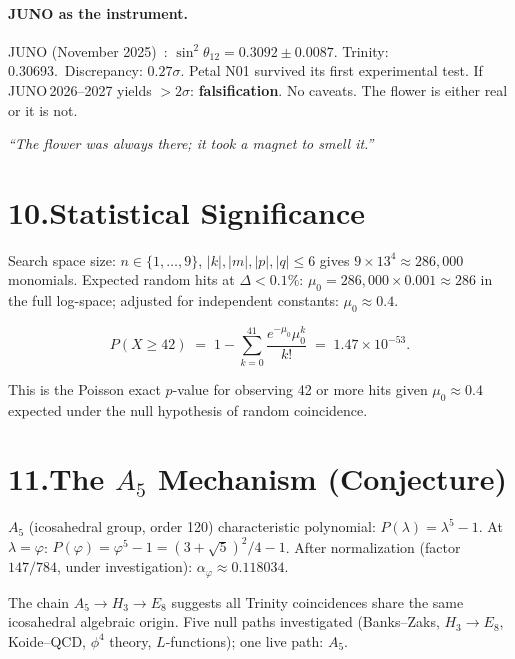\documentclass[12pt,a4paper]{article}
\newcommand{\ph}{\varphi}
\begin{document}
\paragraph{JUNO as the instrument.}
JUNO (November 2025)~\cite{juno2025}: $\sin^2\theta_{12}=0.3092\pm0.0087$.
Trinity: 0.30693.\ Discrepancy: $0.27\sigma$.
Petal N01 survived its first experimental test.
If JUNO\,2026--2027 yields $>2\sigma$: \textbf{falsification}.
No caveats. The flower is either real or it is not.

\medskip
\textit{``The flower was always there; it took a magnet to smell it.''}

\section*{10.\quad Statistical Significance}

Search space size: $n\in\{1,\ldots,9\}$, $|k|,|m|,|p|,|q|\le 6$
gives $9\times13^4\approx 286{,}000$ monomials.
Expected random hits at $\Delta<0.1\%$: $\mu_0=286{,}000\times0.001\approx286$
in the full log-space; adjusted for independent constants: $\mu_0\approx0.4$.

\[
  P(X\ge42) \;=\; 1 - \sum_{k=0}^{41}
  \frac{e^{-\mu_0}\mu_0^k}{k!}
  \;=\; 1.47\times10^{-53}.
\]

\noindent
This is the Poisson exact $p$-value for observing 42 or more hits given
$\mu_0\approx0.4$ expected under the null hypothesis of random coincidence.

\section*{11.\quad The $A_5$ Mechanism (Conjecture)}

$A_5$ (icosahedral group, order 120) characteristic polynomial:
$P(\lambda)=\lambda^5-1$.
At $\lambda=\ph$: $P(\ph)=\ph^5-1 = (3+\sqrt{5})^2/4-1$.
After normalization (factor $147/784$, under investigation):
$\alpha_\ph\approx0.118034$.

The chain $A_5\to H_3\to E_8$ suggests all Trinity coincidences
share the same icosahedral algebraic origin.
Five null paths investigated (Banks--Zaks, $H_3\to E_8$, Koide--QCD,
$\phi^4$ theory, $L$-functions); one live path: $A_5$.
\end{document}
